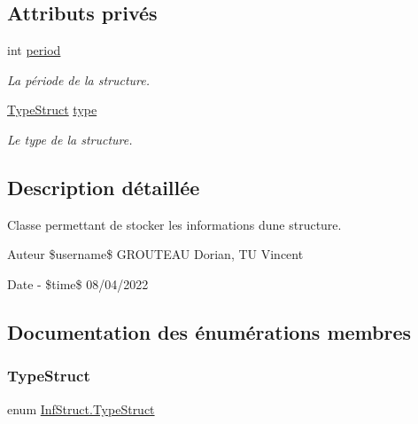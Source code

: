 \subsection*{Attributs privés}
\begin{DoxyCompactItemize}
\item 
int \mbox{\hyperlink{class_inf_struct_aca18a5c2da38d672b4129d46a2250a8a}{period}}
\begin{DoxyCompactList}\small\item\em La période de la structure. \end{DoxyCompactList}\item 
\mbox{\hyperlink{class_inf_struct_a8ae868ec37f73a12d478505a728fcbfd}{Type\+Struct}} \mbox{\hyperlink{class_inf_struct_ab5f36d712d31a76be0d829cc8cc55fa6}{type}}
\begin{DoxyCompactList}\small\item\em Le type de la structure. \end{DoxyCompactList}\end{DoxyCompactItemize}


\subsection{Description détaillée}
Classe permettant de stocker les informations d\textquotesingle{}une structure. 

\begin{DoxyAuthor}{Auteur}
\$username\$ G\+R\+O\+U\+T\+E\+AU Dorian, TU Vincent 
\end{DoxyAuthor}
\begin{DoxyDate}{Date}
-\/ \$time\$ 08/04/2022 
\end{DoxyDate}


\subsection{Documentation des énumérations membres}
\mbox{\label{class_inf_struct_a8ae868ec37f73a12d478505a728fcbfd}} 
\subsubsection{\texorpdfstring{Type\+Struct}{TypeStruct}}
{\footnotesize\ttfamily enum \mbox{\hyperlink{class_inf_struct_a8ae868ec37f73a12d478505a728fcbfd}{Inf\+Struct.\+Type\+Struct}}\hspace{0.3cm}{\ttfamily [strong]}}



